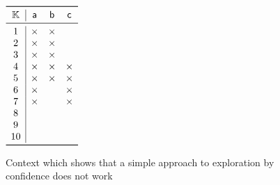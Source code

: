 \begin{Example}
  \label{expl:simple-exploration-by-confidence-does-not-work}
  \begin{figure}[t]
    \centering
    \def\x{\times}
    \begin{math}
      \begin{array}{c|ccc}
        \toprule
        \con K & \mathsf{a} & \mathsf{b} & \mathsf{c} \\
        \midrule
        1 & \x & \x &    \\
        2 & \x & \x &    \\
        3 & \x & \x &    \\
        4 & \x & \x & \x \\
        5 & \x & \x & \x \\
        6 & \x &    & \x \\
        7 & \x &    & \x \\
        8 &    &    &    \\
        9 &    &    &    \\
        10 &   &    &    \\
        \bottomrule
      \end{array}
    \end{math}
    \caption{\label{fig:simple-exploration-by-confidence-does-not-work} Context which
      shows that a simple approach to exploration by confidence does not work}
  \end{figure}
  

\end{Example}
